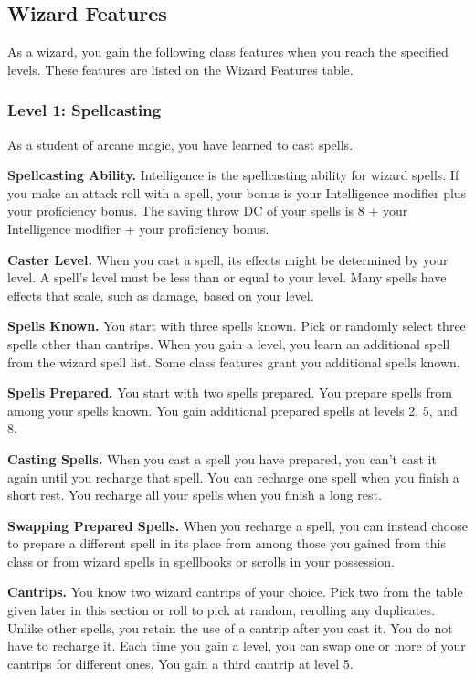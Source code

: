 \documentclass[12pt,letterpaper,twocolumn,openany,nodeprecatedcode,bg=none]{dndbook}
\begin{document}
\subsection{Wizard Features}\label{wizard-features-1}

As a wizard, you gain the following class features when you reach the
specified levels. These features are listed on the Wizard Features
table.

\subsubsection{Level 1: Spellcasting}\label{level-1-spellcasting}

As a student of arcane magic, you have learned to cast spells.

\textbf{Spellcasting Ability.} Intelligence is the spellcasting ability
for wizard spells. If you make an attack roll with a spell, your bonus
is your Intelligence modifier plus your proficiency bonus. The saving
throw DC of your spells is 8 + your Intelligence modifier + your
proficiency bonus.

\textbf{Caster Level.} When you cast a spell, its effects might be
determined by your level. A spell's level must be less than or equal to
your level. Many spells have effects that scale, such as damage, based
on your level.

\textbf{Spells Known.} You start with three spells known. Pick or
randomly select three spells other than cantrips. When you gain a level,
you learn an additional spell from the wizard spell list. Some class
features grant you additional spells known.

\textbf{Spells Prepared.} You start with two spells prepared. You
prepare spells from among your spells known. You gain additional
prepared spells at levels 2, 5, and 8.

\textbf{Casting Spells.} When you cast a spell you have prepared, you
can't cast it again until you recharge that spell. You can recharge one
spell when you finish a short rest. You recharge all your spells when
you finish a long rest.

\textbf{Swapping Prepared Spells.} When you recharge a spell, you can
instead choose to prepare a different spell in its place from among
those you gained from this class or from wizard spells in spellbooks or
scrolls in your possession.

\textbf{Cantrips.} You know two wizard cantrips of your choice. Pick two
from the table given later in this section or roll to pick at random,
rerolling any duplicates. Unlike other spells, you retain the use of a
cantrip after you cast it. You do not have to recharge it. Each time you
gain a level, you can swap one or more of your cantrips for different
ones. You gain a third cantrip at level 5.
\end{document}
